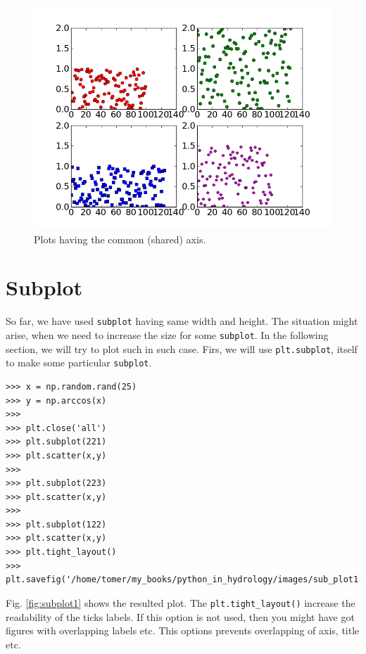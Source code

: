 \documentclass[10pt]{book}
\begin{document}
\beforefig
\begin{figure}[h!]
  \centering
    \includegraphics[scale=0.5]{images/shared_xy.png}
  \caption{Plots having the common (shared) axis.}
   \label{fig:shared_xy}
\end{figure}
\afterfig

\section{Subplot}
So far, we have used \verb"subplot" having same width and height. The situation might arise, when we need to increase the size for some \verb"subplot". In the following section, we will try to plot such in such case. Firs, we will use \verb"plt.subplot", itself to make some particular \verb"subplot". 

\beforeverb \begin{verbatim}
>>> x = np.random.rand(25)
>>> y = np.arccos(x)
>>> 
>>> plt.close('all')
>>> plt.subplot(221)
>>> plt.scatter(x,y)
>>> 
>>> plt.subplot(223)
>>> plt.scatter(x,y)
>>> 
>>> plt.subplot(122)
>>> plt.scatter(x,y)
>>> plt.tight_layout()
>>> plt.savefig('/home/tomer/my_books/python_in_hydrology/images/sub_plot1.png')
\end{verbatim} \afterverb
Fig. \ref{fig:subplot1} shows the resulted plot. The \verb"plt.tight_layout()" increase the readability of the ticks labels. If this option is not used, then you might have got figures with overlapping labels etc. This options prevents overlapping of axis, title etc.
\end{document}
